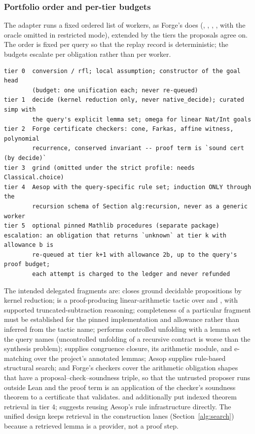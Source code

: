 \subsubsection{Portfolio order and per-tier budgets}

The adapter runs a fixed ordered list of workers, as Forge's  does (, , , , with the oracle omitted in restricted mode), extended by the tiers the proposals agree on. The order is fixed per query so that the replay record is deterministic; the budgets escalate per obligation rather than per worker.
\begin{lstlisting}
tier 0  conversion / rfl; local assumption; constructor of the goal head
        (budget: one unification each; never re-queued)
tier 1  decide (kernel reduction only, never native_decide); curated simp with
        the query's explicit lemma set; omega for linear Nat/Int goals
tier 2  Forge certificate checkers: cone, Farkas, affine witness, polynomial
        recurrence, conserved invariant -- proof term is `sound cert (by decide)`
tier 3  grind (omitted under the strict profile: needs Classical.choice)
tier 4  Aesop with the query-specific rule set; induction ONLY through the
        recursion schema of Section alg:recursion, never as a generic worker
tier 5  optional pinned Mathlib procedures (separate package)
escalation: an obligation that returns `unknown` at tier k with allowance b is
        re-queued at tier k+1 with allowance 2b, up to the query's proof budget;
        each attempt is charged to the ledger and never refunded
\end{lstlisting}

The intended delegated fragments are:  closes ground decidable propositions by kernel reduction;  is a proof-producing linear-arithmetic tactic over  and , with supported truncated-subtraction reasoning; completeness of a particular fragment must be established for the pinned implementation and allowance rather than inferred from the tactic name;  performs controlled unfolding with a lemma set the query names (uncontrolled unfolding of a recursive contract is worse than the synthesis problem);  supplies congruence closure, its arithmetic module, and e-matching over the project's annotated lemmas; Aesop supplies rule-based structural search; and Forge's checkers cover the arithmetic obligation shapes that have a proposal--check--soundness triple, so that the untrusted proposer runs outside Lean and the proof term is an application of the checker's soundness theorem to a certificate that  validates\cite{forge}.  and  additionally put indexed theorem retrieval in tier 4;  suggests reusing Aesop's rule infrastructure directly. The unified design keeps retrieval in the construction lanes (Section~\ref{alg:search}) because a retrieved lemma is a provider, not a proof step.

